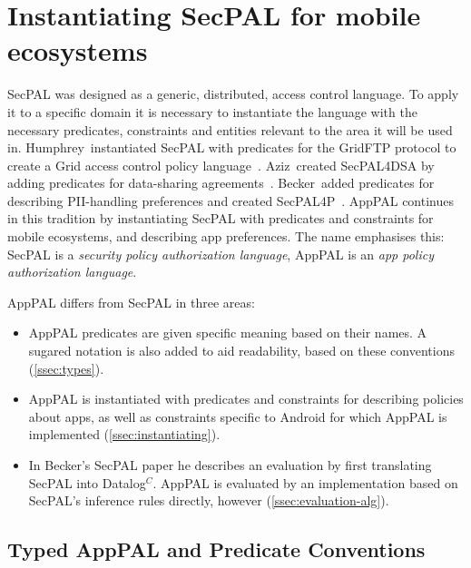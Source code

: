 \documentclass[thesis.tex]{subfiles}
\begin{document}
\section{Instantiating SecPAL for mobile ecosystems}
\label{sec:instantiating}

SecPAL was designed as a generic, distributed, access control language.
To apply it to a specific domain it is necessary to instantiate the language with the necessary predicates, constraints and entities relevant to the area it will be used in.
Humphrey~\etal instantiated SecPAL with predicates for the GridFTP protocol to create a Grid access control policy language~\cite{humphrey_fine-grained_2007}.
Aziz~\etal created SecPAL4DSA by adding predicates for data-sharing agreements~\cite{aziz_secpal4dsa:_2011}.
Becker~\etal added predicates for describing \ac{PII}-handling preferences and created SecPAL4P~\cite{becker_framework_????}.
AppPAL continues in this tradition by instantiating SecPAL with predicates and constraints for mobile ecosystems, and describing app preferences.
The name emphasises this: SecPAL is a \emph{security policy authorization language}, AppPAL is an \emph{app policy authorization language}.

AppPAL differs from SecPAL in three areas:
\begin{itemize}
  \item AppPAL predicates are given specific meaning based on their names.  
     A sugared notation is also added to aid readability, based on these conventions (\autoref{ssec:types}).
  \item AppPAL is instantiated with predicates and constraints for describing policies about apps, as well as constraints specific to Android for which AppPAL is implemented (\autoref{ssec:instantiating}).
  \item In Becker's SecPAL paper he describes an evaluation by first translating SecPAL into Datalog$^C$.
	AppPAL is evaluated by an implementation based on SecPAL's inference rules directly, however (\autoref{ssec:evaluation-alg}). 
\end{itemize}

\subsection{Typed AppPAL and Predicate Conventions}
\label{ssec:types}
\end{document}
